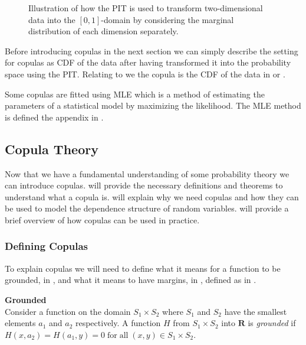 \begin{figure}
\begin{minipage}{0.4\textwidth}
        \label{fig:CorrelatedUniformScatter}
    \end{minipage}
    \caption{Illustration of how the \gls{PIT} is used to transform two-dimensional data into the $[0,1]$-domain by considering the marginal distribution of each dimension separately.}
    \label{fig:PITonData}
\end{figure}

Before introducing copulas in the next section we can simply describe the setting for copulas as \gls{CDF} of the data after having transformed it into the probability space using the \gls{PIT}. Relating to  we the copula is the \gls{CDF} of the data in  or .

Some copulas are fitted using \gls{MLE} which is a method of estimating the parameters of a statistical model by maximizing the likelihood. The \gls{MLE} method is defined the appendix in .


\subsection{Copula Theory}\label{sec:CopulaTheory}
Now that we have a fundamental understanding of some probability theory we can introduce copulas.  will provide the necessary definitions and theorems to understand what a copula is.  will explain why we need copulas and how they can be used to model the dependence structure of random variables.  will provide a brief overview of how copulas can be used in practice.

\subsubsection{Defining Copulas}\label{sec:DefiningCopulas}
To explain copulas we will need to define what it means for a function to be grounded, in , and what it means to have margins, in , defined as in .

\begin{definition}\label{def:grounded}\textbf{Grounded} \\
    Consider a function on the domain $S_1\times S_2$ where $S_1$ and $S_2$ have the smallest elements $a_1$ and $a_2$ respectively. A function $H$ from $S_1\times S_2$ into $\mathbf{R}$ is \emph{grounded} if $H(x,a_2)= H(a_1,y) = 0 \;\mathrm{for \;all\;} (x,y) \in S_1\times S_2.$
\end{definition}

